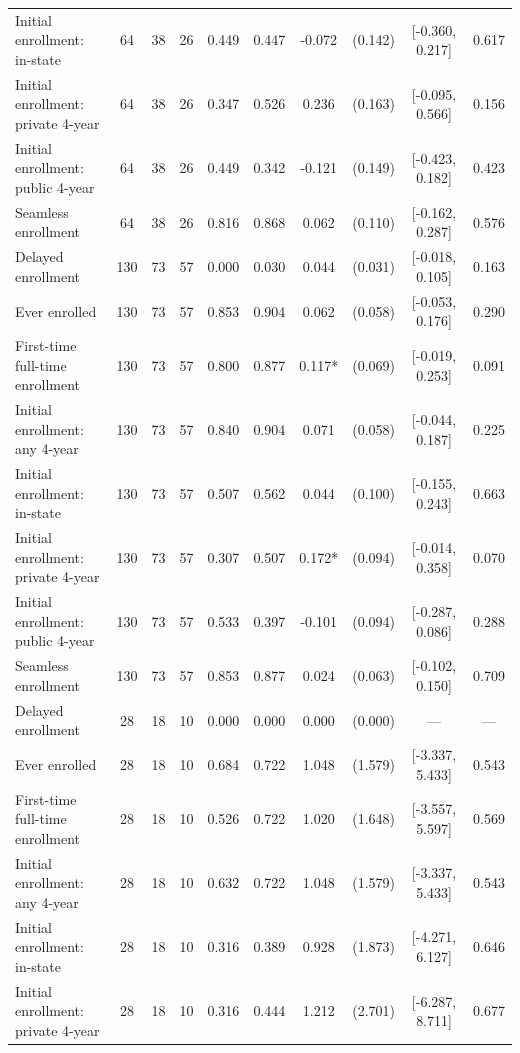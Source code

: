 \begin{table}[t]
\begin{tabular*}{\linewidth}{@{\extracolsep{\fill}}l|ccccccccc}
Initial enrollment: in-state & 64 & 38 & 26 & 0.449 & 0.447 & -0.072 & (0.142) & [-0.360, 0.217] & 0.617 \\ 
Initial enrollment: private 4-year & 64 & 38 & 26 & 0.347 & 0.526 & 0.236 & (0.163) & [-0.095, 0.566] & 0.156 \\ 
Initial enrollment: public 4-year & 64 & 38 & 26 & 0.449 & 0.342 & -0.121 & (0.149) & [-0.423, 0.182] & 0.423 \\ 
Seamless enrollment & 64 & 38 & 26 & 0.816 & 0.868 & 0.062 & (0.110) & [-0.162, 0.287] & 0.576 \\ 
Delayed enrollment & 130 & 73 & 57 & 0.000 & 0.030 & 0.044 & (0.031) & [-0.018, 0.105] & 0.163 \\ 
Ever enrolled & 130 & 73 & 57 & 0.853 & 0.904 & 0.062 & (0.058) & [-0.053, 0.176] & 0.290 \\ 
First-time full-time enrollment & 130 & 73 & 57 & 0.800 & 0.877 & 0.117* & (0.069) & [-0.019, 0.253] & 0.091 \\ 
Initial enrollment: any 4-year & 130 & 73 & 57 & 0.840 & 0.904 & 0.071 & (0.058) & [-0.044, 0.187] & 0.225 \\ 
Initial enrollment: in-state & 130 & 73 & 57 & 0.507 & 0.562 & 0.044 & (0.100) & [-0.155, 0.243] & 0.663 \\ 
Initial enrollment: private 4-year & 130 & 73 & 57 & 0.307 & 0.507 & 0.172* & (0.094) & [-0.014, 0.358] & 0.070 \\ 
Initial enrollment: public 4-year & 130 & 73 & 57 & 0.533 & 0.397 & -0.101 & (0.094) & [-0.287, 0.086] & 0.288 \\ 
Seamless enrollment & 130 & 73 & 57 & 0.853 & 0.877 & 0.024 & (0.063) & [-0.102, 0.150] & 0.709 \\ 
Delayed enrollment & 28 & 18 & 10 & 0.000 & 0.000 & 0.000 & (0.000) & — & — \\ 
Ever enrolled & 28 & 18 & 10 & 0.684 & 0.722 & 1.048 & (1.579) & [-3.337, 5.433] & 0.543 \\ 
First-time full-time enrollment & 28 & 18 & 10 & 0.526 & 0.722 & 1.020 & (1.648) & [-3.557, 5.597] & 0.569 \\ 
Initial enrollment: any 4-year & 28 & 18 & 10 & 0.632 & 0.722 & 1.048 & (1.579) & [-3.337, 5.433] & 0.543 \\ 
Initial enrollment: in-state & 28 & 18 & 10 & 0.316 & 0.389 & 0.928 & (1.873) & [-4.271, 6.127] & 0.646 \\ 
Initial enrollment: private 4-year & 28 & 18 & 10 & 0.316 & 0.444 & 1.212 & (2.701) & [-6.287, 8.711] & 0.677 \\ 

\end{tabular*}
\end{table}
